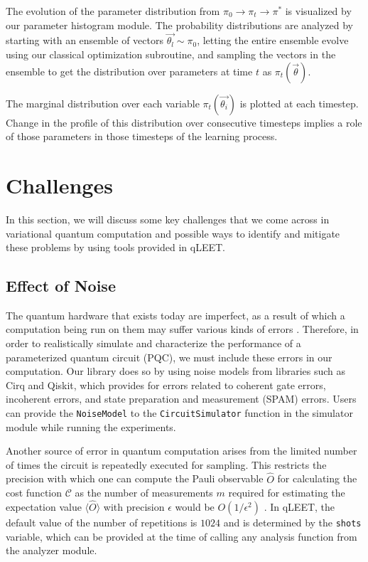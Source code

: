The evolution of the parameter distribution from $\pi_0 \rightarrow \pi_t \rightarrow \pi^*$ is visualized by our parameter histogram module. The probability distributions are analyzed by starting with an ensemble of vectors $\vec{\theta_l} \sim \pi_0$, letting the entire ensemble evolve using our classical optimization subroutine, and sampling the vectors in the ensemble to get the distribution over parameters at time $t$ as $\pi_t(\vec{\theta})$. 

The marginal distribution over each variable $\pi_t(\vec{\theta_i})$ is plotted at each timestep. Change in the profile of this distribution over consecutive timesteps implies a role of those parameters in those timesteps of the learning process.


\section{\label{sec:challenges}Challenges}

In this section, we will discuss some key challenges that we come across in variational quantum computation and possible ways to identify and mitigate these problems by using tools provided in qLEET.

\subsection{Effect of Noise}

The quantum hardware that exists today are imperfect, as a result of which a computation being run on them may suffer various kinds of errors \cite{Chaudhary2022-kl}. Therefore, in order to realistically simulate and characterize the performance of a parameterized quantum circuit (PQC), we must include these errors in our computation. Our library does so by using noise models from libraries such as Cirq and Qiskit, which provides for errors related to coherent gate errors, incoherent errors, and state preparation and measurement (SPAM) errors. Users can provide the \texttt{NoiseModel} to the \texttt{CircuitSimulator} function in the simulator module while running the experiments. 

Another source of error in quantum computation arises from the limited number of times the circuit is repeatedly executed for sampling. This restricts the precision with which one can compute the Pauli observable $\hat{O}$ for calculating the cost function $\mathcal{C}$ as the number of measurements $m$ required for estimating the expectation value $\langle\hat{O}\rangle$ with precision $\epsilon$ would be $O(1/\epsilon^2)$ \cite{Higgott2019variationalquantum}. In qLEET, the default value of the number of repetitions is $1024$ and is determined by the \texttt{shots} variable, which can be provided at the time of calling any analysis function from the analyzer module.

